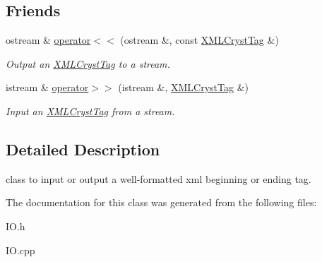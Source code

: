 \subsection*{Friends}
\begin{DoxyCompactItemize}
\item 
\mbox{\label{class_obj_cryst_1_1_x_m_l_cryst_tag_a45a81f89a25fe1192f50330d453e195c}} 
ostream \& \mbox{\hyperlink{class_obj_cryst_1_1_x_m_l_cryst_tag_a45a81f89a25fe1192f50330d453e195c}{operator$<$$<$}} (ostream \&, const \mbox{\hyperlink{class_obj_cryst_1_1_x_m_l_cryst_tag}{X\+M\+L\+Cryst\+Tag}} \&)
\begin{DoxyCompactList}\small\item\em Output an \mbox{\hyperlink{class_obj_cryst_1_1_x_m_l_cryst_tag}{X\+M\+L\+Cryst\+Tag}} to a stream. \end{DoxyCompactList}\item 
\mbox{\label{class_obj_cryst_1_1_x_m_l_cryst_tag_ac262675809dec8086fe3793a695a541f}} 
istream \& \mbox{\hyperlink{class_obj_cryst_1_1_x_m_l_cryst_tag_ac262675809dec8086fe3793a695a541f}{operator$>$$>$}} (istream \&, \mbox{\hyperlink{class_obj_cryst_1_1_x_m_l_cryst_tag}{X\+M\+L\+Cryst\+Tag}} \&)
\begin{DoxyCompactList}\small\item\em Input an \mbox{\hyperlink{class_obj_cryst_1_1_x_m_l_cryst_tag}{X\+M\+L\+Cryst\+Tag}} from a stream. \end{DoxyCompactList}\end{DoxyCompactItemize}


\subsection{Detailed Description}
class to input or output a well-\/formatted xml beginning or ending tag. 



The documentation for this class was generated from the following files\+:\begin{DoxyCompactItemize}
\item 
I\+O.\+h\item 
I\+O.\+cpp\end{DoxyCompactItemize}
